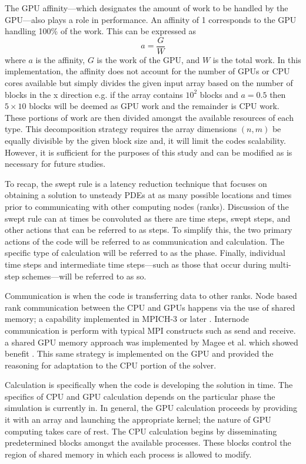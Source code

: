 \documentclass[review]{elsarticle}
\begin{document}
\par
The GPU affinity---which designates the amount of work to be handled by the GPU---also plays a role in performance. An affinity of 1 corresponds to the GPU handling 100\% of the work. This can be expressed as
\begin{equation}
    a = \frac{G}{W}
\end{equation}
where $a$ is the affinity, $G$ is the work of the GPU, and $W$ is the total work. In this implementation, the affinity does not account for the number of GPUs or CPU cores available but simply divides the given input array based on the number of blocks in the x direction e.g. if the array contains $10^2$ blocks and $a=0.5$ then $5\times10$ blocks will be deemed as GPU work and the remainder is CPU work. These portions of work are then divided amongst the available resources of each type. This decomposition strategy requires the array dimensions $(n, m)$ be equally divisible by the given block size and, it will limit the codes scalability. However, it is sufficient for the purposes of this study and can be modified as is necessary for future studies. 

\par
To recap, the swept rule is a latency reduction technique that focuses on obtaining a solution to unsteady PDEs at as many possible locations and times prior to communicating with other computing nodes (ranks). Discussion of the swept rule can at times be convoluted as there are time steps, swept steps, and other actions that can be referred to as steps. To simplify this, the two primary actions of the code will be referred to as communication and calculation. The specific type of calculation will be referred to as the phase. Finally, individual time steps and intermediate time steps---such as those that occur during multi-step schemes---will be referred to as so. 

\par
 Communication is when the code is transferring data to other ranks. Node based rank communication between the CPU and GPUs happens via the use of shared memory; a capability implemented in MPICH-3 or later \cite{Hoefler2013MPIMemory}. Internode communication is perform with typical MPI constructs such as send and receive. a shared GPU memory approach was implemented by Magee et al. which showed benefit \cite{Magee2018AcceleratingDecomposition}. This same strategy is implemented on the GPU and provided the reasoning for adaptation to the CPU portion of the solver. 
 \par
 Calculation is specifically when the code is developing the solution in time. The specifics of CPU and GPU calculation depends on the particular phase the simulation is currently in. In general, the GPU calculation proceeds by providing it with an array and launching the appropriate kernel; the nature of GPU computing takes care of rest. The CPU calculation begins by disseminating predetermined blocks amongst the available processes. These blocks control the region of shared memory in which each process is allowed to modify.
 
\end{document}
